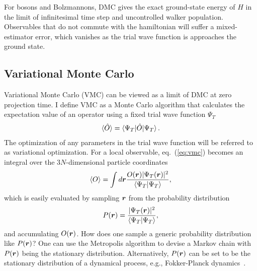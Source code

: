For bosons and Bolzmannons, DMC gives the exact ground-state energy of $H$ in the limit of infinitesimal time step and uncontrolled walker population. Observables that do not commute with the hamiltonian will suffer a mixed-estimator error, which vanishes as the trial wave function is approaches the ground state.

\subsection{Variational Monte Carlo}
Variational Monte Carlo (VMC) can be viewed as a limit of DMC at zero projection time. I define VMC as a Monte Carlo algorithm that calculates the expectation value of an operator using a fixed trial wave function $\Psi_T$
\begin{align} \label{eq:vmc}
\braket{\hat{O}} = \braket{\Psi_T|\hat{O}|\Psi_T}.
\end{align}
The optimization of any parameters in the trial wave function will be referred to as variational optimization.
For a local observable, eq.~(\ref{eq:vmc}) becomes an integral over the $3N$-dimensional particle coordinates
\begin{align}
\braket{O} = \int d\boldsymbol{r} \dfrac{O(\boldsymbol{r})\vert\Psi_T(\boldsymbol{r})\vert^2}{\braket{\Psi_T|\Psi_T}},
\end{align}
which is easily evaluated by sampling $\boldsymbol{r}$ from the probability distribution
\begin{align}
P(\boldsymbol{r}) = \dfrac{\vert\Psi_T(\boldsymbol{r})\vert^2}{\braket{\Psi_T|\Psi_T}},
\end{align}
and accumulating $O(\boldsymbol{r})$. How does one sample a generic probability distribution like $P(\boldsymbol{r})$? One can use the Metropolis algorithm to devise a Markov chain with $P(\boldsymbol{r})$ being the stationary distribution. Alternatively, $P(\boldsymbol{r})$ can be set to be the stationary distribution of a dynamical process, e.g., Fokker-Planck dynamics~\cite{Hammond1994}.

